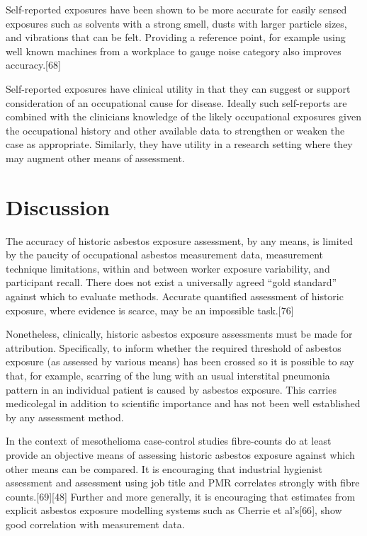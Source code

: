 \documentclass[12pt,a4paper,]{report}
\begin{document}
Self-reported exposures have been shown to be more accurate for easily
sensed exposures such as solvents with a strong smell, dusts with larger
particle sizes, and vibrations that can be felt. Providing a reference
point, for example using well known machines from a workplace to gauge
noise category also improves accuracy.{[}68{]}

Self-reported exposures have clinical utility in that they can suggest
or support consideration of an occupational cause for disease. Ideally
such self-reports are combined with the clinicians knowledge of the
likely occupational exposures given the occupational history and other
available data to strengthen or weaken the case as appropriate.
Similarly, they have utility in a research setting where they may
augment other means of assessment.

\hypertarget{discussion-2}{%
\section{Discussion}\label{discussion-2}}

The accuracy of historic asbestos exposure assessment, by any means, is
limited by the paucity of occupational asbestos measurement data,
measurement technique limitations, within and between worker exposure
variability, and participant recall. There does not exist a universally
agreed ``gold standard'' against which to evaluate methods. Accurate
quantified assessment of historic exposure, where evidence is scarce,
may be an impossible task.{[}76{]}

Nonetheless, clinically, historic asbestos exposure assessments must be
made for attribution. Specifically, to inform whether the required
threshold of asbestos exposure (as assessed by various means) has been
crossed so it is possible to say that, for example, scarring of the lung
with an usual interstital pneumonia pattern in an individual patient is
caused by asbestos exposure. This carries medicolegal in addition to
scientific importance and has not been well established by any
assessment method.

In the context of mesothelioma case-control studies fibre-counts do at
least provide an objective means of assessing historic asbestos exposure
against which other means can be compared. It is encouraging that
industrial hygienist assessment and assessment using job title and PMR
correlates strongly with fibre counts.{[}69{]}{[}48{]} Further and more
generally, it is encouraging that estimates from explicit asbestos
exposure modelling systems such as Cherrie et al's{[}66{]}, show good
correlation with measurement data.
\end{document}
